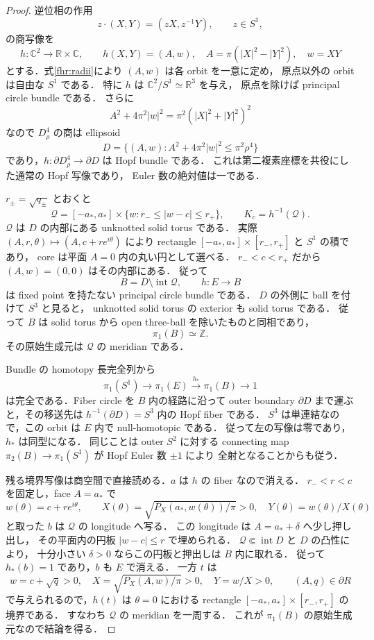 \begin{proof}
逆位相の作用
\[
 z\cdot(X,Y)=(zX,z^{-1}Y),\qquad z\in S^1,
\]
の商写像を
\[
 h:\mathbb C^2\longrightarrow\mathbb R\times\mathbb C,
 \qquad h(X,Y)=(A,w),\quad
 A=\pi(|X|^2-|Y|^2),\quad w=XY
\]
とする．式\eqref{fhr:radii}により $(A,w)$ は各 orbit を一意に定め，
原点以外の orbit は自由な $S^1$ である．
特に $h$ は $\mathbb C^2/S^1\simeq\mathbb R^3$ を与え，
原点を除けば principal circle bundle である．
さらに
\[
 A^2+4\pi^2|w|^2
   =\pi^2(|X|^2+|Y|^2)^2
\]
なので $D^4_\rho$ の商は ellipsoid
\[
 D=\{(A,w):A^2+4\pi^2|w|^2\le\pi^2\rho^4\}
\]
であり，$h:\partial D^4_\rho\to\partial D$ は Hopf bundle である．
これは第二複素座標を共役にした通常の Hopf 写像であり，
Euler 数の絶対値は一である．

$r_\pm=\sqrt{q_\pm}$ とおくと
\[
 \mathcal Q=[-a_*,a_*]\times
       \{w:r_-\le|w-c|\le r_+\},\qquad
 K_c=h^{-1}(\mathcal Q).
\]
$\mathcal Q$ は $D$ の内部にある unknotted solid torus である．
実際 $(A,r,\theta)\mapsto(A,c+r e^{i\theta})$ により
rectangle $[-a_*,a_*]\times[r_-,r_+]$ と $S^1$ の積であり，
core は平面 $A=0$ 内の丸い円として選べる．
$r_-<c<r_+$ だから $(A,w)=(0,0)$ はその内部にある．
従って
\[
 B=D\setminus\operatorname{int}\mathcal Q,
 \qquad h:E\longrightarrow B
\]
は fixed point を持たない principal circle bundle である．
$D$ の外側に ball を付けて $S^3$ と見ると，
unknotted solid torus の exterior も solid torus である．
従って $B$ は solid torus から open three-ball を除いたものと同相であり，
\[
 \pi_1(B)\simeq\mathbb Z.
\]
その原始生成元は $\mathcal Q$ の meridian である．

Bundle の homotopy 長完全列から
\[
 \pi_1(S^1)\longrightarrow\pi_1(E)
       \xrightarrow{h_*}\pi_1(B)\longrightarrow1
\]
は完全である．Fiber circle を $B$ 内の経路に沿って
outer boundary $\partial D$ まで運ぶと，その移送先は
$h^{-1}(\partial D)=S^3$ 内の Hopf fiber である．
$S^3$ は単連結なので，この orbit は $E$ 内で null-homotopic である．
従って左の写像は零であり，$h_*$ は同型になる．
同じことは outer $S^2$ に対する connecting map
$\pi_2(B)\to\pi_1(S^1)$ が Hopf Euler 数 $\pm1$ により
全射となることからも従う．

残る境界写像は商空間で直接読める．$a$ は $h$ の fiber なので消える．
$r_-<r<c$ を固定し，face $A=a_*$ で
\[
 w(\theta)=c+r e^{i\theta},\qquad
 X(\theta)=\sqrt{P_X(a_*,w(\theta))/\pi}>0,
 \quad Y(\theta)=w(\theta)/X(\theta)
\]
と取った $b$ は $\mathcal Q$ の longitude へ写る．
この longitude は $A=a_*+\delta$ へ少し押し出し，
その平面内の円板 $|w-c|\le r$ で埋められる．
$\mathcal Q\Subset\operatorname{int}D$ と $D$ の凸性により，
十分小さい $\delta>0$ ならこの円板と押出しは $B$ 内に取れる．
従って $h_*(b)=1$ であり，$b$ も $E$ で消える．
一方 $t$ は
\[
 w=c+\sqrt q>0,\quad
 X=\sqrt{P_X(A,w)/\pi}>0,\quad Y=w/X>0,
 \qquad (A,q)\in\partial R
\]
で与えられるので，$h(t)$ は $\theta=0$ における
rectangle $[-a_*,a_*]\times[r_-,r_+]$ の境界である．
すなわち $\mathcal Q$ の meridian を一周する．
これが $\pi_1(B)$ の原始生成元なので結論を得る．
\end{proof}

